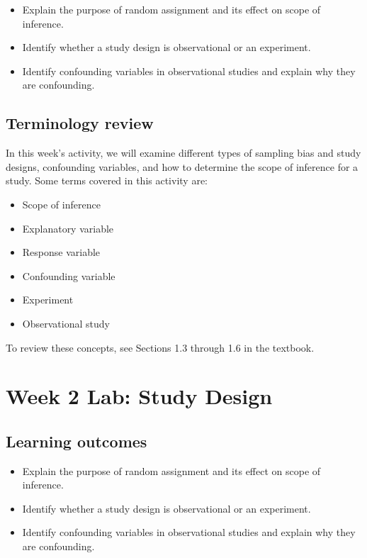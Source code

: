 \documentclass[
]{report}
\begin{document}
\begin{itemize}
\item
  Explain the purpose of random assignment and its effect on scope of inference.
\item
  Identify whether a study design is observational or an experiment.
\item
  Identify confounding variables in observational studies and explain why they are confounding.
\end{itemize}

\hypertarget{terminology-review-3}{%
\subsection{Terminology review}\label{terminology-review-3}}

In this week's activity, we will examine different types of sampling bias and study designs, confounding variables, and how to determine the scope of inference for a study. Some terms covered in this activity are:

\begin{itemize}
\item
  Scope of inference
\item
  Explanatory variable
\item
  Response variable
\item
  Confounding variable
\item
  Experiment
\item
  Observational study
\end{itemize}

To review these concepts, see Sections 1.3 through 1.6 in the textbook.

\hypertarget{week-2-lab-study-design}{%
\section{Week 2 Lab: Study Design}\label{week-2-lab-study-design}}


\hypertarget{learning-outcomes-4}{%
\subsection{Learning outcomes}\label{learning-outcomes-4}}

\begin{itemize}
\item
  Explain the purpose of random assignment and its effect on scope of inference.
\item
  Identify whether a study design is observational or an experiment.
\item
  Identify confounding variables in observational studies and explain why they are confounding.
\end{itemize}
\end{document}
